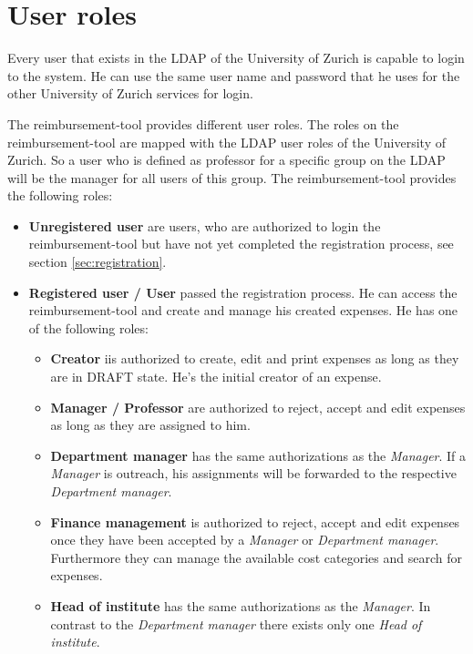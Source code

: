 \section{User roles}
\label{user-roles}

Every user that exists in the LDAP of the University of Zurich is capable to login to the system. He can use the same user name and password that he uses for the other University of Zurich services for login.

The reimbursement-tool provides different user roles. The roles on the reimbursement-tool are mapped with the LDAP user roles of the University of Zurich. So a user who is defined as professor for a specific group on the LDAP will be the manager for all users of this group. The reimbursement-tool provides the following roles:

\begin{itemize}
    \item \textbf{Unregistered user} are users, who are authorized to login the reimbursement-tool but have not yet completed the registration process, see section \ref{sec:registration}.
    \item \textbf{Registered user / User} passed the registration process. He can access the reimbursement-tool and create and manage his created expenses. He has one of the following roles:

    \begin{itemize}
        \item \textbf{Creator} iis authorized to create, edit and print expenses as long as they are in DRAFT state. He's the initial creator of an expense.

        \item \textbf{Manager / Professor} are authorized to reject, accept and edit expenses as long as they are assigned to him.

        \item \textbf{Department manager} has the same authorizations as the \textit{Manager}. If a \textit{Manager} is outreach, his assignments will be forwarded to the respective \textit{Department manager}.

        \item \textbf{Finance management} is authorized to reject, accept and edit expenses once they have been accepted by a \textit{Manager} or \textit{Department manager}. Furthermore they can manage the available cost categories and search for expenses.

        \item \textbf{Head of institute} has the same authorizations as the \textit{Manager}. In contrast to the \textit{Department manager} there exists only one \textit{Head of institute}.
    \end{itemize}
\end{itemize}

